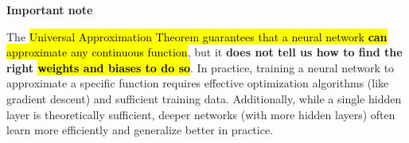 \highspace
\begin{flushleft}
    \textcolor{Red2}{ \textbf{Important note}}
\end{flushleft}
The \hl{Universal Approximation Theorem guarantees that a neural network \textbf{can} approximate any continuous function}, but it \textbf{does not tell us how to find the right \hl{weights and biases to do so}}. In practice, training a neural network to approximate a specific function requires effective optimization algorithms (like gradient descent) and sufficient training data. Additionally, while a single hidden layer is theoretically sufficient, deeper networks (with more hidden layers) often learn more efficiently and generalize better in practice.